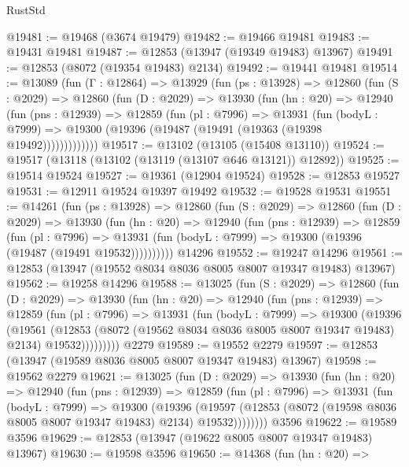 \begin{lexlean}{RustStd}
\begin{coremodule}
@19481 := @19468 (@3674 @19479)
@19482 := @19466 @19481
@19483 := @19431 @19481
@19487 := @12853 (@13947 (@19349 @19483) @13967)
@19491 := @12853 (@8072 (@19354 @19483) @2134)
@19492 := @19441 @19481
@19514 := @13089
    (fun (Γ : @12864) =>
    @13929
      (fun (ps : @13928) =>
      @12860
        (fun (S : @2029) =>
        @12860
          (fun (D : @2029) =>
          @13930
            (fun (hn : @20) =>
            @12940
              (fun (pns : @12939) =>
              @12859
                (fun (pl : @7996) =>
                @13931
                  (fun (bodyL : @7999) =>
                  @19300 (@19396 (@19487 (@19491 (@19363 (@19398 @19492)))))))))))))
@19517 := @13102 (@13105 (@15408 @13110))
@19524 := @19517 (@13118 (@13102 (@13119 (@13107 @646 @13121)) @12892))
@19525 := @19514 @19524
@19527 := @19361 (@12904 @19524)
@19528 := @12853 @19527
@19531 := @12911 @19524 @19397 @19492
@19532 := @19528 @19531
@19551 := @14261
    (fun (ps : @13928) =>
    @12860
      (fun (S : @2029) =>
      @12860
        (fun (D : @2029) =>
        @13930
          (fun (hn : @20) =>
          @12940
            (fun (pns : @12939) =>
            @12859
              (fun (pl : @7996) =>
              @13931 (fun (bodyL : @7999) => @19300 (@19396 (@19487 (@19491 @19532))))))))))
    @14296
@19552 := @19247 @14296
@19561 := @12853 (@13947 (@19552 @8034 @8036 @8005 @8007 @19347 @19483) @13967)
@19562 := @19258 @14296
@19588 := @13025
    (fun (S : @2029) =>
    @12860
      (fun (D : @2029) =>
      @13930
        (fun (hn : @20) =>
        @12940
          (fun (pns : @12939) =>
          @12859
            (fun (pl : @7996) =>
            @13931
              (fun (bodyL : @7999) =>
              @19300
                (@19396
                  (@19561
                    (@12853
                      (@8072 (@19562 @8034 @8036 @8005 @8007 @19347 @19483) @2134)
                      @19532)))))))))
    @2279
@19589 := @19552 @2279
@19597 := @12853 (@13947 (@19589 @8036 @8005 @8007 @19347 @19483) @13967)
@19598 := @19562 @2279
@19621 := @13025
    (fun (D : @2029) =>
    @13930
      (fun (hn : @20) =>
      @12940
        (fun (pns : @12939) =>
        @12859
          (fun (pl : @7996) =>
          @13931
            (fun (bodyL : @7999) =>
            @19300
              (@19396
                (@19597
                  (@12853 (@8072 (@19598 @8036 @8005 @8007 @19347 @19483) @2134) @19532))))))))
    @3596
@19622 := @19589 @3596
@19629 := @12853 (@13947 (@19622 @8005 @8007 @19347 @19483) @13967)
@19630 := @19598 @3596
@19650 := @14368
    (fun (hn : @20) =>

\end{coremodule}
\end{lexlean}
